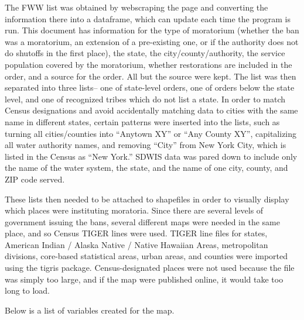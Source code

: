 \documentclass[
  12pt,
]{article}
\begin{document}
The FWW list was obtained by webscraping the page and converting the
information there into a dataframe, which can update each time the
program is run. This document has information for the type of moratorium
(whether the ban was a moratorium, an extension of a pre-existing one,
or if the authority does not do shutoffs in the first place), the state,
the city/county/authority, the service population covered by the
moratorium, whether restorations are included in the order, and a source
for the order. All but the source were kept. The list was then separated
into three lists-- one of state-level orders, one of orders below the
state level, and one of recognized tribes which do not list a state. In
order to match Census designations and avoid accidentally matching data
to cities with the same name in different states, certain patterns were
inserted into the lists, such as turning all cities/counties into
``Anytown XY'' or ``Any County XY'', capitalizing all water authority
names, and removing ``City'' from New York City, which is listed in the
Census as ``New York.'' SDWIS data was pared down to include only the
name of the water system, the state, and the name of one city, county,
and ZIP code served.

These lists then needed to be attached to shapefiles in order to
visually display which places were instituting moratoria. Since there
are several levels of government issuing the bans, several different
maps were needed in the same place, and so Census TIGER lines were used.
TIGER line files for states, American Indian / Alaska Native / Native
Hawaiian Areas, metropolitan divisions, core-based statistical areas,
urban areas, and counties were imported using the tigris package.
Census-designated places were not used because the file was simply too
large, and if the map were published online, it would take too long to
load.

Below is a list of variables created for the map.
\end{document}
